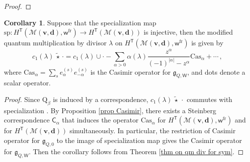 \documentclass[10pt]{amsart}
\theoremstyle{definition}
\newtheorem{Corollary}[Theorem]{Corollary}
\numberwithin{equation}{section}
\newcommand{\sQ}{\mathrm{Q}}
\newcommand{\bP}{\mathbb{P}}
\newcommand{\bv}{\mathbf{v}}
\newcommand{\bd}{\mathbf{d}}
\newcommand{\cM}{\mathcal{M}}
\newcommand{\sT}{\mathsf{T}}
\newcommand{\sW}{\mathsf{W}}
\newcommand{\sw}{\mathsf{w}}
\newcommand{\yh}[1]{\textcolor{red}{$[$ Yehao: #1 $]$}}
\begin{document}
\begin{proof}
\end{proof}

\begin{Corollary}\label{cor qm div for sym_sp inj}
Suppose that the specialization map $\mathrm{sp}\colon H^\sT(\cM(\bv,\bd),\sw^{\mathrm{fr}})\to H^\sT(\cM(\bv,\bd))$ is injective, then the modified quantum multiplication by divisor $\lambda$ on $H^\sT(\cM(\bv,\bd),\sw^{\mathrm{fr}})$ is given by
$$c_1(\lambda)\,\widetilde{\star}\, \cdot =c_1(\lambda)\cup \cdot -\sum_{\alpha>0}\alpha(\lambda)\frac{z^\alpha}{(-1)^{|\alpha|}-z^\alpha}\mathrm{Cas}_\alpha+\cdots \,,$$
where $\mathrm{Cas}_\alpha=\sum_{s} e_{\alpha}^{(s)} e_{-\alpha}^{(s)}$ is the Casimir operator for $\mathfrak{g}_{Q,\sW}$, and dots denote a scalar operator.
\end{Corollary}

\begin{proof}
Since $\sQ_\beta$ is induced by a correspondence, $c_1(\lambda)\,\widetilde{\star}\,\cdot$ commutes with specialization \cite[Prop.~7.17]{COZZ}. By Proposition \ref{prop Casimir}, there exists a Steinberg correspondence $\mathsf C_\alpha$ that induces the operator  $\mathrm{Cas}_\alpha$ for $H^\sT(\cM(\bv,\bd),\sw^{\mathrm{fr}})$ and for $H^\sT(\cM(\bv,\bd))$ simultaneously. In particular, the restriction of Casimir operator for $\mathfrak{g}_{Q,0}$ to the image of specialization map gives the Casimir operator for $\mathfrak{g}_{Q,\sW}$. Then the corollary follows from Theorem \ref{thm on qm div for sym}.
\end{proof}

\end{document}
